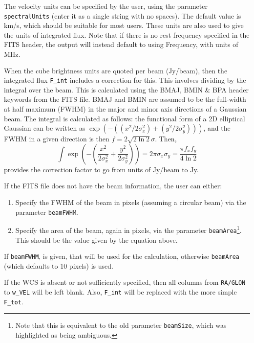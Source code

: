 The velocity units can be specified by the user, using the parameter
\texttt{spectralUnits} (enter it as a single string with no
spaces). The default value is km/s, which should be suitable for most
users. These units are also used to give the units of integrated
flux. Note that if there is no rest frequency specified in the FITS
header, the \duchamp output will instead default to using Frequency,
with units of MHz.

When the cube brightness units are quoted per beam (\eg Jy/beam), then
the integrated flux \texttt{F\_int} includes a correction for
this. This involves dividing by the integral over the beam. This is
calculated using the BMAJ, BMIN \& BPA header keywords from the FITS
file. BMAJ and BMIN are assumed to be the full-width at half maximum
(FWHM) in the major and minor axis directions of a Gaussian beam. The
integral is calculated as follows: the functional form of a 2D
elliptical Gaussian can be written as
$\exp(-((x^2/2\sigma_x^2)+(y^2/2\sigma_y^2)))$, and the FWHM in a
given direction is then $f=2\sqrt{2\ln2}\sigma$. Then, 
\[
\int
\exp\left(-\left(\frac{x^2}{2\sigma_x^2}+\frac{y^2}{2\sigma_y^2}\right)\right)
= 2\pi\sigma_x\sigma_y
=\frac{\pi f_x f_y}{4\ln2}
\]
provides the correction factor to go from units of Jy/beam to Jy. 

If the FITS file does not have the beam information, the user can
either:
\begin{enumerate}
\item Specify the FWHM of the beam in pixels (assuming a circular
  beam) via the parameter \texttt{beamFWHM}.
\item Specify the area of the beam, again in pixels, via the parameter
  \texttt{beamArea}\footnote{Note that this is equivalent to the old
    parameter \texttt{beamSize}, which was highlighted as being
    ambiguous.}. This should be the value given by the equation above.
\end{enumerate}
If \texttt{beamFWHM}, is given, that will be used for the calculation,
otherwise \texttt{beamArea} (which defaults to 10 pixels) is used.

If the WCS is absent or not sufficiently specified, then all columns
from \texttt{RA/GLON} to \texttt{w\_VEL} will be left blank. Also,
\texttt{F\_int} will be replaced with the more simple \texttt{F\_tot}.

